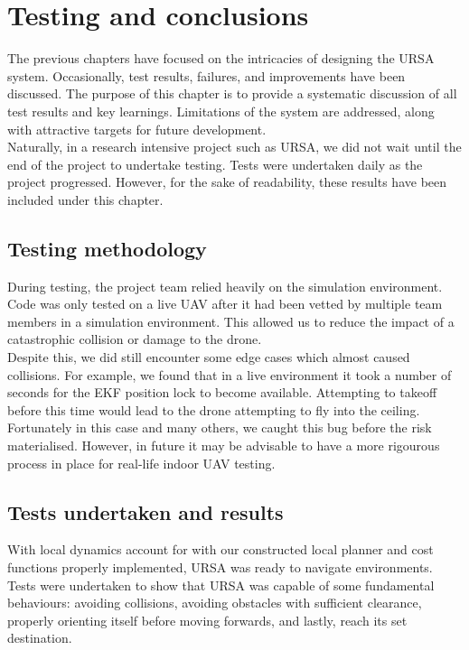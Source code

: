 \documentclass[capstone_report.tex]{subfiles}
\begin{document}
\chapter{Testing and conclusions}
The previous chapters have focused on the intricacies of designing the URSA system. Occasionally, test results, failures, and improvements have been discussed. The purpose of this chapter is to provide a systematic discussion of all test results and key learnings. Limitations of the system are addressed, along with attractive targets for future development.\\

Naturally, in a research intensive project such as URSA, we did not wait until the end of the project to undertake testing. Tests were undertaken daily as the project progressed. However, for the sake of readability, these results have been included under this chapter.

\pagebreak

\section{Testing methodology}
During testing, the project team relied heavily on the simulation environment. Code was only tested on a live UAV after it had been vetted by multiple team members in a simulation environment. This allowed us to reduce the impact of a catastrophic collision or damage to the drone.\\

Despite this, we did still encounter some edge cases which almost caused collisions. For example, we found that in a live environment it took a number of seconds for the EKF position lock to become available. Attempting to takeoff before this time would lead to the drone attempting to fly into the ceiling. Fortunately in this case and many others, we caught this bug before the risk materialised. However, in future it may be advisable to have a more rigourous process in place for real-life indoor UAV testing.


\section{Tests undertaken and results}
With local dynamics account for with our constructed local planner and cost functions properly implemented, URSA was ready to navigate environments. Tests were undertaken to show that URSA was capable of some fundamental behaviours: avoiding collisions, avoiding obstacles with suﬃcient clearance, properly orienting itself before moving forwards, and lastly, reach its set destination. \\
\end{document}
